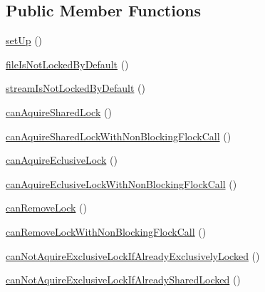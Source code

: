 \subsection*{Public Member Functions}
\begin{DoxyCompactItemize}
\item 
\mbox{\hyperlink{classorg_1_1bovigo_1_1vfs_1_1vfs_stream_wrapper_flock_test_case_a0bc688732d2b3b162ffebaf7812e78da}{set\+Up}} ()
\item 
\mbox{\hyperlink{classorg_1_1bovigo_1_1vfs_1_1vfs_stream_wrapper_flock_test_case_aa144356fd32c00c72dd17f7d8e1edf9f}{file\+Is\+Not\+Locked\+By\+Default}} ()
\item 
\mbox{\hyperlink{classorg_1_1bovigo_1_1vfs_1_1vfs_stream_wrapper_flock_test_case_af6395342497769cfb8bf8d1d6d01581f}{stream\+Is\+Not\+Locked\+By\+Default}} ()
\item 
\mbox{\hyperlink{classorg_1_1bovigo_1_1vfs_1_1vfs_stream_wrapper_flock_test_case_a42f4cb7f9e38fc15fb7a698080abb735}{can\+Aquire\+Shared\+Lock}} ()
\item 
\mbox{\hyperlink{classorg_1_1bovigo_1_1vfs_1_1vfs_stream_wrapper_flock_test_case_a8403888d643c3620c44ad95574958494}{can\+Aquire\+Shared\+Lock\+With\+Non\+Blocking\+Flock\+Call}} ()
\item 
\mbox{\hyperlink{classorg_1_1bovigo_1_1vfs_1_1vfs_stream_wrapper_flock_test_case_a3aadad883068df958e1fb0a5567f5551}{can\+Aquire\+Eclusive\+Lock}} ()
\item 
\mbox{\hyperlink{classorg_1_1bovigo_1_1vfs_1_1vfs_stream_wrapper_flock_test_case_afbdc685549e383ac4d03c03f961045f4}{can\+Aquire\+Eclusive\+Lock\+With\+Non\+Blocking\+Flock\+Call}} ()
\item 
\mbox{\hyperlink{classorg_1_1bovigo_1_1vfs_1_1vfs_stream_wrapper_flock_test_case_aa939a880199200caaee12e50b2d22a33}{can\+Remove\+Lock}} ()
\item 
\mbox{\hyperlink{classorg_1_1bovigo_1_1vfs_1_1vfs_stream_wrapper_flock_test_case_ab941246e7ca69398c37781618b74944d}{can\+Remove\+Lock\+With\+Non\+Blocking\+Flock\+Call}} ()
\item 
\mbox{\hyperlink{classorg_1_1bovigo_1_1vfs_1_1vfs_stream_wrapper_flock_test_case_adbe692aca22a22c32611f37f4d5b8e0c}{can\+Not\+Aquire\+Exclusive\+Lock\+If\+Already\+Exclusively\+Locked}} ()
\item 
\mbox{\hyperlink{classorg_1_1bovigo_1_1vfs_1_1vfs_stream_wrapper_flock_test_case_a4137e3a51a54487a176062cf9d302879}{can\+Not\+Aquire\+Exclusive\+Lock\+If\+Already\+Shared\+Locked}} ()
\item 

\end{DoxyCompactItemize}

